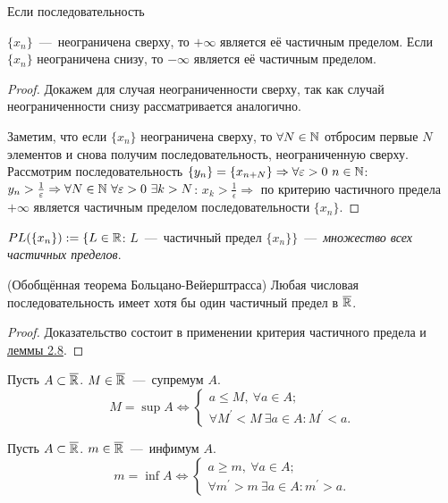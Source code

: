 \begin{lemma}
    \hypertarget{lemm2.8}{Если последовательность} $\{ x_{n} \}$~---~неограничена сверху, то $+ \infty$ является её частичным пределом. Если $\{ x_{n} \}$ неограничена снизу, то $- \infty$ является её частичным пределом.
\end{lemma}
\begin{proof}
    Докажем для случая неограниченности сверху, так как случай неограниченности снизу рассматривается аналогично.

    Заметим, что если $\{ x_{n} \}$ неограничена сверху, то $\forall N \in \mathbb{N}$ отбросим первые $N$ элементов и снова получим последовательность, неограниченную сверху. Рассмотрим последовательность $\{ y_{n} \} = \{ x_{n + N}\} \Rightarrow \forall \varepsilon > 0 \  n \in \mathbb{N}$: $y_{n} > \frac{1}{\varepsilon} \Rightarrow \forall N \in \mathbb{N} \  \forall \varepsilon > 0 \  \exists k > N$: $x_{k} > \frac{1}{\epsilon} \Rightarrow$ по критерию частичного предела $+ \infty$ является частичным пределом последовательности $\{ x_{n} \}$.
\end{proof}
\begin{definition}
    $PL (\{ x_{n} \}) := \{ L \in \mathbb{R}$: $L$~---~частичный предел $\{ x_{n} \} \}$~---~\textit{множество всех частичных пределов}.
\end{definition}
\begin{theorem}
    (Обобщённая теорема Больцано-Вейерштрасса) Любая числовая последовательность имеет хотя бы один частичный предел в $\overline{\mathbb{R}}$.
\end{theorem}
\begin{proof}
    Доказательство состоит в применении критерия частичного предела и \hyperlink{lemm2.8}{леммы 2.8}.
\end{proof}
\begin{definition}
    Пусть $A \subset \overline{\mathbb{R}}$. $M \in \overline{\mathbb{R}}$~---~супремум $A$.
    $$M = \sup A \Leftrightarrow \begin{cases}
        a \leq M, \  \forall a \in A; \\
        \forall M^{'} < M \  \exists a \in A: M^{'} < a.
    \end{cases}$$
\end{definition}
\begin{definition}
    Пусть $A \subset \overline{\mathbb{R}}$. $m \in \overline{\mathbb{R}}$~---~инфимум $A$. 
    $$m = \inf A \Leftrightarrow \begin{cases}
        a \geq m, \  \forall a \in A; \\
        \forall m^{'} > m \  \exists a \in A: m^{'} > a.
    \end{cases}$$
\end{definition}
